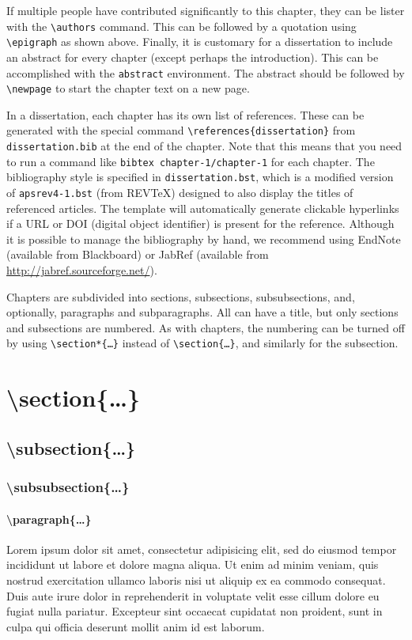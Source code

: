 If multiple people have contributed significantly to this chapter, they can be lister with the \texttt{\textbackslash authors} command. This can be followed by a quotation using \texttt{\textbackslash epigraph} as shown above. Finally, it is customary for a dissertation to include an abstract for every chapter (except perhaps the introduction). This can be accomplished with the \texttt{abstract} environment. The abstract should be followed by \texttt{\textbackslash newpage} to start the chapter text on a new page.

In a dissertation, each chapter has its own list of references. These can be generated with the special command \texttt{\textbackslash references\{dissertation\}} from \texttt{dissertation.bib} at the end of the chapter. Note that this means that you need to run a command like \texttt{bibtex chapter-1/chapter-1} for each chapter. The bibliography style is specified in \texttt{dissertation.bst}, which is a modified version of \texttt{apsrev4-1.bst} (from REVTeX) designed to also display the titles of referenced articles. The template will automatically generate clickable hyperlinks if a URL or DOI (digital object identifier) is present for the reference. Although it is possible to manage the bibliography by hand, we recommend using EndNote (available from Blackboard) or JabRef (available from \url{http://jabref.sourceforge.net/}).

Chapters are subdivided into sections, subsections, subsubsections, and, optionally, paragraphs and subparagraphs. All can have a title, but only sections and subsections are numbered. As with chapters, the numbering can be turned off by using \texttt{\textbackslash section*\{\ldots\}} instead of \texttt{\textbackslash section\{\ldots\}}, and similarly for the subsection.
\section{\textbackslash section\{\ldots\}}
\subsection{\textbackslash subsection\{\ldots\}}
\subsubsection{\textbackslash subsubsection\{\ldots\}}
\paragraph{\textbackslash paragraph\{\ldots\}}
Lorem ipsum dolor sit amet, consectetur adipisicing elit, sed do eiusmod tempor incididunt ut labore et dolore magna aliqua. Ut enim ad minim veniam, quis nostrud exercitation ullamco laboris nisi ut aliquip ex ea commodo consequat. Duis aute irure dolor in reprehenderit in voluptate velit esse cillum dolore eu fugiat nulla pariatur. Excepteur sint occaecat cupidatat non proident, sunt in culpa qui officia deserunt mollit anim id est laborum.

